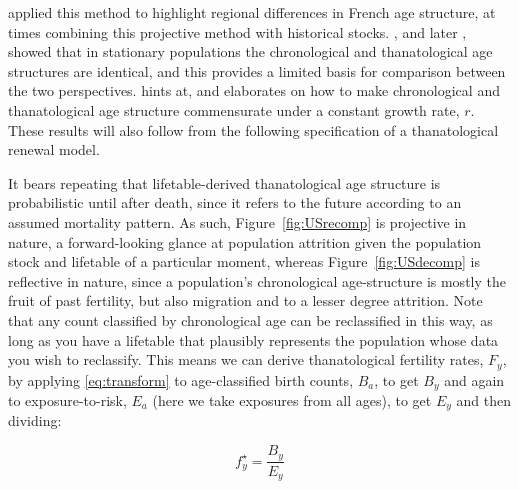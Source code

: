 \documentclass{article}
\begin{document}
\citet{brouard1986structure} applied this method to highlight regional
differences in French age structure, at times combining this projective method
with historical stocks. \citet{brouard1989mouvements}, and later
\citet{vaupel2009life}, showed that in stationary populations the chronological
and thanatological age structures are identical, and this provides a
limited basis for comparison between the two perspectives. \citet{wachter2014essential} hints at, and
\citet{vaupel2014stable} elaborates on how to make chronological and
thanatological age structure commensurate under a constant growth rate, $r$.
These results will also follow from the following specification of a
thanatological renewal model.

It bears repeating that lifetable-derived thanatological age structure is probabilistic until after death, since it refers to the future according to an assumed mortality pattern.
As such, Figure~\ref{fig:USrecomp} is projective in nature, a forward-looking
glance at population attrition given the population stock and lifetable of a
particular moment, whereas Figure~\ref{fig:USdecomp} is reflective in nature, since a population's chronological age-structure is mostly the fruit of past fertility, but also migration and to a lesser degree attrition. Note that any count classified by chronological age can be
reclassified in this way, as long as you have a lifetable that plausibly represents the population whose data you wish to reclassify. This means we can derive thanatological fertility rates, $F_y$, by applying \eqref{eq:transform}
to age-classified birth counts, $B_a$, to get $B_y$ and again to
exposure-to-risk, $E_a$ (here we take exposures from all ages), to get $E_y$ and then dividing:

\begin{equation}
f^\star_y = \frac{B_y}{E_y}
\end{equation}
\end{document}
